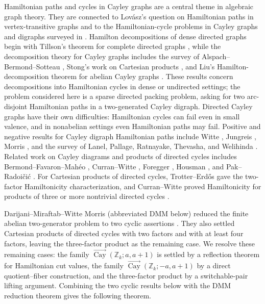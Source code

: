 \documentclass[11pt]{article}
\newcommand{\Cay}{\overrightarrow{\operatorname{Cay}}}
\newcommand{\Z}{\mathbb Z}
\begin{document}
Hamiltonian paths and cycles in Cayley graphs are a central theme in algebraic graph theory.  They are connected to Lov\'asz's question on Hamiltonian paths in vertex-transitive graphs \cite{Lovasz1970} and to the Hamiltonian-cycle problems in Cayley graphs and digraphs surveyed in \cite{WitteGallian1984,CurranGallian1996}.  Hamilton decompositions of dense directed graphs begin with Tillson's theorem for complete directed graphs \cite{Tillson1980}, while the decomposition theory for Cayley graphs includes the survey of Alspach--Bermond--Sotteau \cite{AlspachBermondSotteau1990}, Stong's work on Cartesian products \cite{Stong1991}, and Liu's Hamilton-decomposition theorem for abelian Cayley graphs \cite{Liu2003}.  These results concern decompositions into Hamiltonian cycles in dense or undirected settings; the problem considered here is a sparse directed packing problem, asking for two arc-disjoint Hamiltonian paths in a two-generated Cayley digraph.  Directed Cayley graphs have their own difficulties: Hamiltonian cycles can fail even in small valence, and in nonabelian settings even Hamiltonian paths may fail.  Positive and negative results for Cayley digraph Hamiltonian paths include Witte \cite{Witte1982}, Jungreis \cite{Jungreis1989}, Morris \cite{Morris2012,WitteMorris2013}, and the survey of Lanel, Pallage, Ratnayake, Thevasha, and Welihinda \cite{LanelEtAl2019}.  Related work on Cayley diagrams and products of directed cycles includes Bermond--Favaron--Mah\'eo \cite{BermondFavaronMaheo1989}, Curran--Witte \cite{CurranWitte1985}, Foregger \cite{Foregger1978}, Housman \cite{Housman1981}, and Pak--Radoi\v{c}i\'c \cite{PakRadoicic2009}.  For Cartesian products of directed cycles, Trotter--Erd\H{o}s gave the two-factor Hamiltonicity characterization, and Curran--Witte proved Hamiltonicity for products of three or more nontrivial directed cycles \cite{TrotterErdos1978,CurranWitte1985}.

Darijani--Miraftab--Witte Morris (abbreviated DMM below) reduced the finite abelian two-generator problem to two cyclic assertions \cite{DMM}.  They also settled Cartesian products of directed cycles with two factors and with at least four factors, leaving the three-factor product as the remaining case.  We resolve these remaining cases: the family $\Cay(\Z_k;a,a+1)$ is settled by a reflection theorem for Hamiltonian cut values, the family $\Cay(\Z_k;-a,a+1)$ by a direct quotient--fiber construction, and the three-factor product by a switchable-pair lifting argument.  Combining the two cyclic results below with the DMM reduction theorem gives the following theorem.
\end{document}
